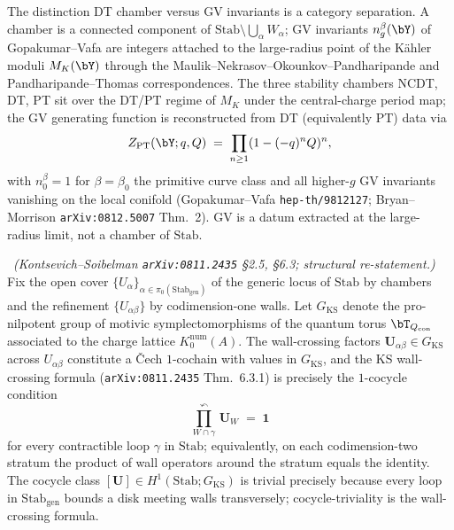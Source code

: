 \begin{remark}
\label{rem:wave5-chambers-vs-kahler}
The distinction DT chamber versus GV invariants is a category
separation. A chamber is a connected component of
$\mathrm{Stab} \setminus \bigcup_\alpha W_\alpha$; GV invariants
$n_g^\beta(\bY)$ of Gopakumar--Vafa are integers attached to the
large-radius point of the Kähler moduli $M_K(\bY)$ through the
Maulik--Nekrasov--Okounkov--Pandharipande and Pandharipande--Thomas
correspondences. The three stability chambers NCDT, DT, PT sit over
the DT/PT regime of $M_K$ under the central-charge period map; the GV
generating function is reconstructed from DT (equivalently PT) data
via
\[
  Z_{\mathrm{PT}}(\bY; q, Q) \;=\; \prod_{n \geq 1} (1 - (-q)^n Q)^{n},
\]
with $n_0^\beta = 1$ for $\beta = \beta_0$ the primitive curve class
and all higher-$g$ GV invariants vanishing on the local conifold
(Gopakumar--Vafa \texttt{hep-th/9812127}; Bryan--Morrison
\texttt{arXiv:0812.5007} Thm.~2). GV is a datum extracted at the
large-radius limit, not a chamber of $\mathrm{Stab}$.
\end{remark}

\begin{theorem}
\label{thm:wave5-ks-h1-cocycle}
\ClaimStatusProvedElsewhere\ \emph{(Kontsevich--Soibelman
\texttt{arXiv:0811.2435} §2.5, §6.3; structural re-statement.)}
Fix the open cover $\{U_\alpha\}_{\alpha \in
\pi_0(\mathrm{Stab}_{\mathrm{gen}})}$ of the generic locus of
$\mathrm{Stab}$ by chambers and the refinement $\{U_{\alpha\beta}\}$
by codimension-one walls. Let $G_{\mathrm{KS}}$ denote the pro-nilpotent
group of motivic symplectomorphisms of the quantum torus
$\bT_{Q_{\mathrm{con}}}$ associated to the charge lattice
$K_0^{\mathrm{num}}(A)$. The wall-crossing factors
$\mathbf{U}_{\alpha\beta} \in G_{\mathrm{KS}}$ across
$U_{\alpha\beta}$ constitute a \v{C}ech $1$-cochain with values in
$G_{\mathrm{KS}}$, and the KS wall-crossing formula
(\texttt{arXiv:0811.2435} Thm.~6.3.1) is precisely the $1$-cocycle
condition
\[
  \prod^\curvearrowleft_{W \cap \gamma}\, \mathbf{U}_W \;=\; \mathbf{1}
\]
for every contractible loop $\gamma$ in $\mathrm{Stab}$; equivalently,
on each codimension-two stratum the product of wall operators around
the stratum equals the identity. The cocycle class
$[\mathbf{U}] \in H^1(\mathrm{Stab}; G_{\mathrm{KS}})$ is trivial
precisely because every loop in $\mathrm{Stab}_{\mathrm{gen}}$ bounds
a disk meeting walls transversely; cocycle-triviality is the
wall-crossing formula.
\end{theorem}

